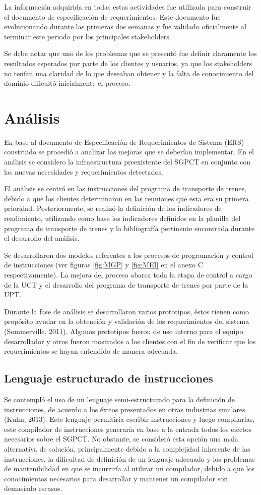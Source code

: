 \documentclass[oneside,12pt, letterpaper, titlepage]{book}
\begin{document}
La información adquirida en todas estas actividades fue utilizada para construir el documento de especificación de requerimientos. Este documento fue evolucionando durante las primeras dos semanas y fue validado oficialmente al terminar este periodo por los principales stakeholders.

Se debe notar que uno de los problemas que se presentó fue definir claramente los resultados esperados por parte de los clientes y usuarios, ya que los stakeholders no tenían una claridad de lo que deseaban obtener y la falta de conocimiento del dominio dificultó inicialmente el proceso.

\section{Análisis}
En base al documento de Especificación de Requerimientos de Sistema (ERS) construido se procedió a analizar las mejoras que se deberían implementar. En el análisis se considero la infraestructura preexistente del SGPCT en conjunto con las nuevas necesidades y requerimientos detectados.

El análisis se centró en las instrucciones del programa de transporte de trenes, debido a que los clientes determinaron en las reuniones que esta era su primera prioridad. Posteriormente, se realizó la definición de los indicadores de rendimiento, utilizando como base los indicadores definidos en la planilla del programa de transporte de trenes y la bibliografía pertinente encontrada durante el desarrollo del análisis.

Se desarrollaron dos modelos referentes a los procesos de programación y control de instrucciones (ver figuras \ref{fig:MGP} y \ref{fig:MEI} en el anexo C respectivamente). La mejora del proceso abarca toda la etapa de control a cargo de la UCT y el desarrollo del programa de transporte de trenes por parte de la UPT.

Durante la fase de análisis se desarrollaron varios prototipos, éstos tienen como propósito ayudar en la obtención y validación de los requerimientos del sistema (Sommerville, 2011). Algunos prototipos fueron de uso interno para el equipo desarrollador y otros fueron mostrados a los clientes con el fin de verificar que los requerimientos se hayan entendido de manera adecuada.

\subsection{Lenguaje estructurado de instrucciones}
Se contempló el uso de un lenguaje semi-estructurado para la definición de instrucciones, de acuerdo a los éxitos presentados en otras industrias similares (Kuhn, 2013). Este lenguaje permitiría escribir instrucciones y luego compilarlas, este compilador de instrucciones generaría en base a la entrada todos los efectos necesarios sobre el SGPCT. No obstante, se consideró esta opción una mala alternativa de solución, principalmente debido a la complejidad inherente de las instrucciones, la dificultad de definición de un lenguaje adecuado y los problemas de mantenibilidad en que se incurriría al utilizar un compilador, debido a que los conocimientos necesarios para desarrollar y mantener un compilador son demasiado escasos.
\end{document}
